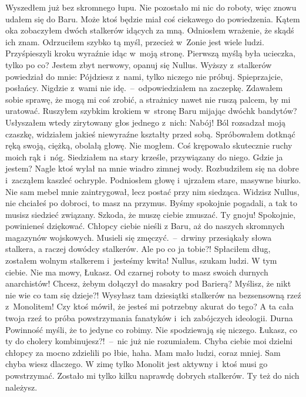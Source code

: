 \documentclass[../MAIN.tex]{subfiles}
\begin{document}
\qd
Wyszedłem już bez skromnego łupu. Nie pozostało mi nic do
roboty, więc znowu udałem się do Baru. Może ktoś będzie miał
coś ciekawego do powiedzenia. Kątem oka zobaczyłem dwóch
stalkerów idących za mną. Odniosłem wrażenie, że skądś ich
znam. Odrzuciłem szybko tą myśl, przecież w~Zonie jest wiele
ludzi. Przyśpieszyli kroku wyraźnie idąc w~moją stronę.
Pierwszą myślą była ucieczka, tylko po co? Jestem zbyt nerwowy,
opanuj się Nullus. Wyższy z~stalkerów powiedział do mnie:
\sd
\xx Pójdziesz z~nami, tylko niczego nie próbuj.
\xx Spieprzajcie, posłańcy. Nigdzie z~wami nie
idę.~--~odpowiedziałem na zaczepkę.
\qd
Zdawałem sobie sprawę, że mogą mi
coś zrobić, a strażnicy nawet nie ruszą palcem, by mi uratować.
Ruszyłem szybkim krokiem w~stronę Baru mijając dwóch\3k
bandytów?
Usłyszałem wtedy zirytowany głos jednego z~nich:
\sx Nabój!
\qd
Ból rozsadzał moją czaszkę, widziałem jakieś niewyraźne
kształty przed sobą. Spróbowałem dotknąć ręką swoją, ciężką,
obolałą głowę. Nie mogłem. Coś krępowało skutecznie ruchy moich
rąk i~nóg. Siedziałem na stary krześle, przywiązany do niego.
Gdzie ja jestem? Nagle ktoś wylał na mnie wiadro zimnej wody.
Rozbudziłem się na dobre i~zacząłem kaszleć ochryple.
Podniosłem głowę i~ujrzałem stare, masywne biurko. Nie sam
mebel mnie zaintrygował, lecz postać przy nim siedząca.
\sd
\xx Widzisz Nullus, nie chciałeś po dobroci, to masz na
przymus.
Byśmy spokojnie pogadali, a tak to musisz siedzieć związany.
Szkoda, że muszę ciebie zmuszać.
\xx Ty gnoju!
\xx Spokojnie, powinieneś dziękować. Chłopcy ciebie nieśli z
Baru, aż do naszych skromnych magazynów wojskowych. Musieli się
zmęczyć.~--~drwiny przesiąkały słowa stalkera, a raczej dowódcy
stalkerów.
\xx Ale po co ja tobie?! Spłaciłem dług, zostałem wolnym
stalkerem i~jesteśmy kwita!
\xx Nullus, szukam ludzi. W tym ciebie.
\xx Nie ma mowy, Łukasz. Od czarnej roboty to masz swoich
durnych
anarchistów! Chcesz, żebym dołączył do masakry pod Barierą?
Myślisz, że nikt nie wie co tam się dzieje?! Wysyłasz tam
dziesiątki stalkerów na bezsensowną rzeź z~Monolitem!
\xx Czy ktoś mówił, że jesteś mi potrzebny akurat do tego? A ta
cała twoja rzeź to próba powstrzymania fanatyków i~ich
zabójczych ideologii. Durna Powinność myśli, że to jedyne co
robimy. Nie spodziewają się niczego.
\xx Łukasz, co ty do cholery kombinujesz?!~--~nic już nie
rozumiałem.
\xx Chyba ciebie moi dzielni chłopcy za mocno zdzielili po
łbie,
haha. Mam mało ludzi, coraz mniej. Sam chyba wiesz dlaczego. W
zimę tylko Monolit jest aktywny i~ktoś musi go powstrzymać.
Zostało mi tylko kilku naprawdę dobrych stalkerów. Ty też do
nich należysz.
\end{document}
